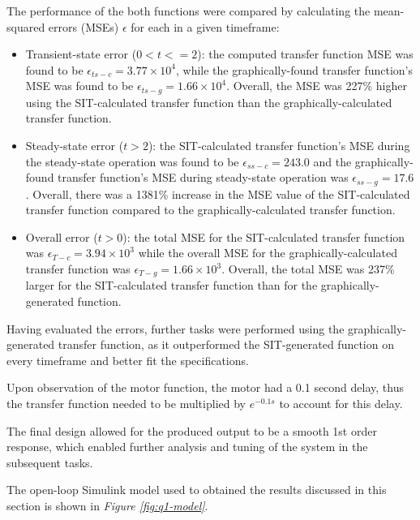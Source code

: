 \documentclass[11pt, onecolumn]{article}
\begin{document}
\par The performance of the both functions were compared by calculating the mean-squared errors (MSEs) $\epsilon$ for each in a given timeframe:
\begin{itemize}
    \item Transient-state error ($0 < t <= 2$): the computed transfer function MSE was found to be $\epsilon_{ts-c} = 3.77 \times 10^4$, while the graphically-found transfer function's MSE was found to be $\epsilon_{ts-g} = 1.66 \times 10^4$. Overall, the MSE was 227\% higher using the SIT-calculated transfer function than the graphically-calculated transfer function.
    \item Steady-state error ($t > 2$): the SIT-calculated transfer function's MSE during the steady-state operation was found to be $\epsilon_{ss-c} = 243.0$ and the graphically-found transfer function's MSE during steady-state operation was $\epsilon_{ss-g} = 17.6$. Overall, there was a 1381\% increase in the MSE value of the SIT-calculated transfer function compared to the graphically-calculated transfer function.
    \item Overall error ($t > 0$): the total MSE for the SIT-calculated transfer function was $\epsilon_{T-c}=3.94\times10^{3}$ while the overall MSE for the graphically-calculated transfer function was $\epsilon_{T-g}=1.66\times10^{3}$. Overall, the total MSE was 237\% larger for the SIT-calculated transfer function than for the graphically-generated function.
\end{itemize}
\par Having evaluated the errors, further tasks were performed using the graphically-generated transfer function, as it outperformed the SIT-generated function on every timeframe and better fit the specifications.
\par Upon observation of the motor function, the motor had a 0.1 second delay, thus the transfer function needed to be multiplied by $e^{-0.1s}$ to account for this delay.
\par The final design allowed for the produced output to be a smooth 1st order response, which enabled further analysis and tuning of the system in the subsequent tasks.
\par The open-loop Simulink model used to obtained the results discussed in this section is shown in \textit{Figure \ref{fig:q1-model}}.\\
\end{document}
